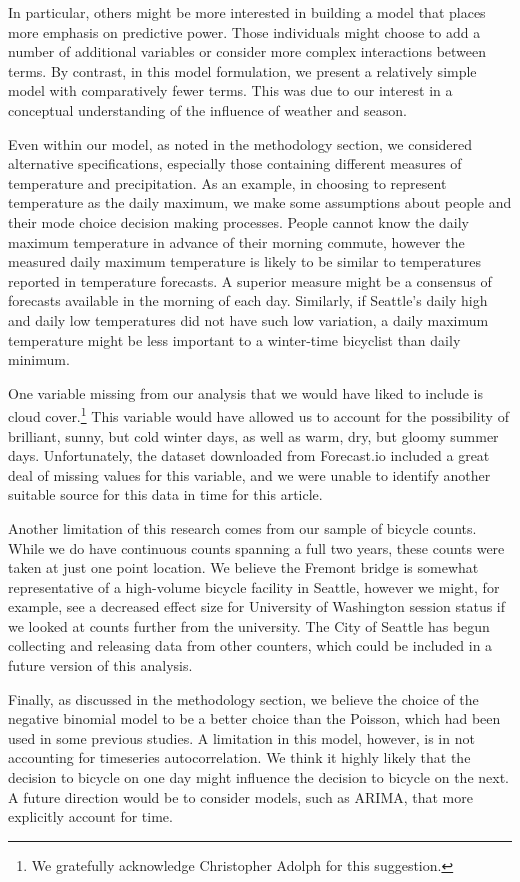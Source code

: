\documentclass[12pt,letterpaper,article,twocolumn]{memoir}
\begin{document}
In particular, others might be more interested in building a model
that places more emphasis on predictive power. Those individuals might
choose to add a number of additional variables or consider more
complex interactions between terms. By contrast, in this model
formulation, we present a relatively simple model with comparatively
fewer terms. This was due to our interest in a conceptual
understanding of the influence of weather and season.

Even within our model, as noted in the methodology section, we
considered alternative specifications, especially those containing
different measures of temperature and precipitation. As an example, in
choosing to represent temperature as the daily maximum, we make some
assumptions about people and their mode choice decision making
processes. People cannot know the daily maximum temperature in advance
of their morning commute, however the measured daily maximum
temperature is likely to be similar to temperatures reported in
temperature forecasts. A superior measure might be a consensus of
forecasts available in the morning of each day. Similarly, if
Seattle's daily high and daily low temperatures did not have such low
variation, a daily maximum temperature might be less important to a
winter-time bicyclist than daily minimum.

One variable missing from our analysis that we would have liked to
include is cloud cover.\footnote{We gratefully acknowledge Christopher
  Adolph for this suggestion.} This variable would have allowed us to
account for the possibility of brilliant, sunny, but cold winter days,
as well as warm, dry, but gloomy summer days. Unfortunately, the
dataset downloaded from Forecast.io included a great deal of missing
values for this variable, and we were unable to identify another
suitable source for this data in time for this article.

Another limitation of this research comes from our sample of bicycle
counts. While we do have continuous counts spanning a full two years,
these counts were taken at just one point location. We believe the
Fremont bridge is somewhat representative of a high-volume bicycle
facility in Seattle, however we might, for example, see a decreased
effect size for University of Washington session status if we looked
at counts further from the university. The City of Seattle has begun
collecting and releasing data from other counters, which could be
included in a future version of this analysis.

Finally, as discussed in the methodology section, we believe the
choice of the negative binomial model to be a better choice than the
Poisson, which had been used in some previous studies. A limitation in
this model, however, is in not accounting for timeseries
autocorrelation. We think it highly likely that the decision to
bicycle on one day might influence the decision to bicycle on the
next. A future direction would be to consider models, such as ARIMA,
that more explicitly account for time.
\end{document}
